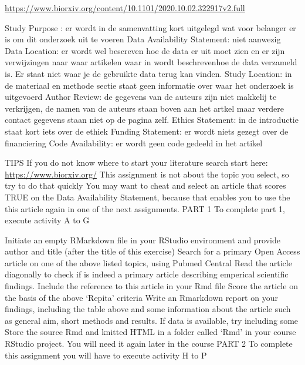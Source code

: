 \documentclass[
]{book}
\begin{document}
\url{https://www.biorxiv.org/content/10.1101/2020.10.02.322917v2.full}

Study Purpose : er wordt in de samenvatting kort uitgelegd wat voor belanger er is om dit onderzoek uit te voeren
Data Availability Statement: niet aanwezig
Data Location: er wordt wel bescreven hoe de data er uit moet zien en er zijn verwijzingen naar waar artikelen waar in wordt beschrevenhoe de data verzameld is. Er staat niet waar je de gebruikte data terug kan vinden.
Study Location: in de materiaal en methode sectie staat geen informatie over waar het onderzoek is uitgevoerd
Author Review: de gegevens van de auteurs zijn niet makkelij te verkrijgen, de namen van de auteurs staan boven aan het artkel maar verdere contact gegevens staan niet op de pagina zelf.
Ethics Statement: in de introductie staat kort iets over de ethiek
Funding Statement: er wordt niets gezegt over de financiering
Code Availability: er wordt geen code gedeeld in het artikel

TIPS
If you do not know where to start your literature search start here: \url{https://www.biorxiv.org/}
This assignment is not about the topic you select, so try to do that quickly
You may want to cheat and select an article that scores TRUE on the Data Availability Statement, because that enables you to use the this article again in one of the next assignments.
PART 1 To complete part 1, execute activity A to G

Initiate an empty RMarkdown file in your RStudio environment and provide author and title (after the title of this exercise)
Search for a primary Open Access article on one of the above listed topics, using Pubmed Central
Read the article diagonally to check if is indeed a primary article describing emperical scientific findings.
Include the reference to this article in your Rmd file
Score the article on the basis of the above `Repita' criteria
Write an Rmarkdown report on your findings, including the table above and some information about the article such as general aim, short methods and results. If data is available, try including some
Store the source Rmd and knitted HTML in a folder called `Rmd' in your course RStudio project. You will need it again later in the course
PART 2 To complete this assignment you will have to execute activity H to P
\end{document}
